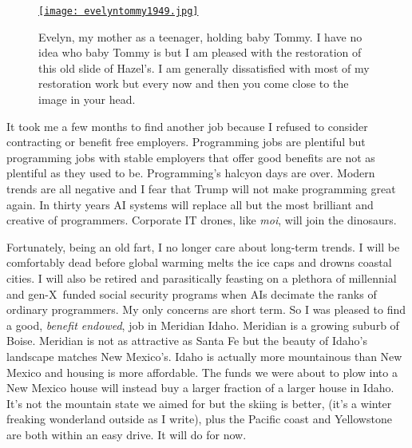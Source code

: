
\captionsetup[figure]{labelformat=empty}
\begin{SCfigure}
\centering
\href{https://conceptcontrol.smugmug.com/People/From-Hazels-Albums-1/i-tLbfswS/A}{\texttt{[image: evelyntommy1949.jpg]}}
\caption[Evelyn, my mother as a teenager, holding baby Tommy]{Evelyn, my mother as a teenager, holding baby Tommy. I have no idea who
baby Tommy is but I am pleased with the restoration of this old slide of
Hazel's. I am generally dissatisfied with most of my restoration work
but every now and then you come close to the image in your
head.}
\label{fig:5275X1}
\end{SCfigure}



It took me a few months to find another job because I refused to
consider contracting or benefit free employers. Programming jobs are
plentiful but programming jobs with stable employers that offer good
benefits are not as plentiful as they used to be. Programming's halcyon
days are over. Modern trends are all negative and I fear that Trump will
not make programming great again. In thirty years AI systems will
replace all but the most brilliant and creative of programmers.
Corporate IT drones, like \emph{moi}, will join the dinosaurs.

Fortunately, being an old fart, I no longer care about long-term trends.
I will be comfortably dead before global warming melts the ice caps and
drowns coastal cities. I will also be retired and parasitically feasting
on a plethora of millennial and gen-X~funded social security programs
when AIs decimate the ranks of ordinary programmers. My only concerns
are short term. So I was pleased to find a good, \emph{benefit endowed},
job in Meridian Idaho. Meridian is a growing suburb of Boise. Meridian
is not as attractive as Santa Fe but the beauty of Idaho's landscape
matches New Mexico's. Idaho is actually more mountainous than New Mexico
and housing is more affordable. The funds we were about to plow into a
New Mexico house will instead buy a larger fraction of a larger house in
Idaho. It's not the mountain state we aimed for but the skiing is
better, (it's a winter freaking wonderland outside as I write), plus the
Pacific coast and Yellowstone are both within an easy drive. It will do
for now.

